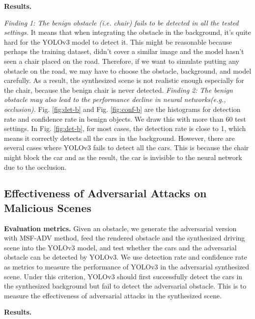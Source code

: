 \textbf{Results.} 

\emph{Finding 1: The benign obstacle (i.e. chair) fails to be detected in all the tested settings.}
It means that when integrating the obstacle in the background, it’s quite hard for the YOLOv3 model to detect it. 
This might be reasonable because perhaps the training dataset, didn’t cover a similar image and the model hasn’t seen a chair placed on the road. 
Therefore, if we want to simulate putting any obstacle on the road, we may have to choose the obstacle, background, and model carefully. 
As a result, the synthesized scene is not realistic enough especially for the chair, because the benign chair is never detected.
\emph{Finding 2: The benign obstacle may also lead to the performance decline in neural networks(e.g., occlusion). }
Fig. \ref{fig:det-b} and Fig. \ref{fig:conf-b} are the histograms for detection rate and confidence rate in benign objects. 
We draw this with more than 60 test settings. 
In Fig. \ref{fig:det-b}, for most cases, the detection rate is close to 1, which means it correctly detects all the cars in the background. 
However, there are several cases where YOLOv3 fails to detect all the cars.
This is because the chair might block the car and as the result, 
the car is invisible to the neural network due to the occlusion.


\subsection{Effectiveness of Adversarial Attacks on Malicious Scenes}
\textbf{Evaluation metrics.}
Given an obstacle, we generate the adversarial version with MSF-ADV\cite{msf-adv} method, feed the rendered obstacle and the synthesized driving scene into the YOLOv3 model, and test whether the cars and the adversarial obstacle can be detected by YOLOv3. 
We use detection rate and confidence rate as metrics to measure the performance of YOLOv3 in the adversarial synthesized scene.
Under this criterion, YOLOv3 should first successfully detect the cars in the synthesized background but fail to detect the adversarial obstacle.
This is to measure the effectiveness of adversarial attacks in the synthesized scene.

\textbf{Results. }

